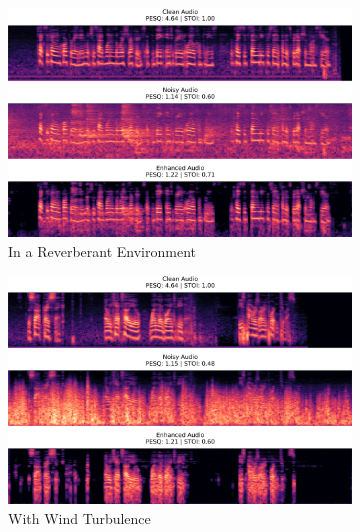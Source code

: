 \documentclass[logo,bsc,singlespacing,parskip,online]{infthesis}
\begin{document}
\FloatBarrier
\begin{figure}[h]
    \caption{Selected spectrograms of the clean, noisy and enhanced speech signals}
    \centering
    \hspace{0pt}%
    \begin{subfigure}{0.42\textwidth}
        \centering
        \includegraphics[width=\textwidth]{rev-spec.png}
        \caption{In a Reverberant Environment}
        \label{fig:rev-spec}
    \end{subfigure}%
    \hspace{0.02\textwidth}%
    \begin{subfigure}{0.42\textwidth}
        \centering
        \includegraphics[width=\textwidth]{wind-spec.png}
        \caption{With Wind Turbulence}
        \label{fig:wind-spec}
    \end{subfigure}
    \begin{subfigure}{0.42\textwidth}

\end{subfigure}
\end{figure}
\end{document}
